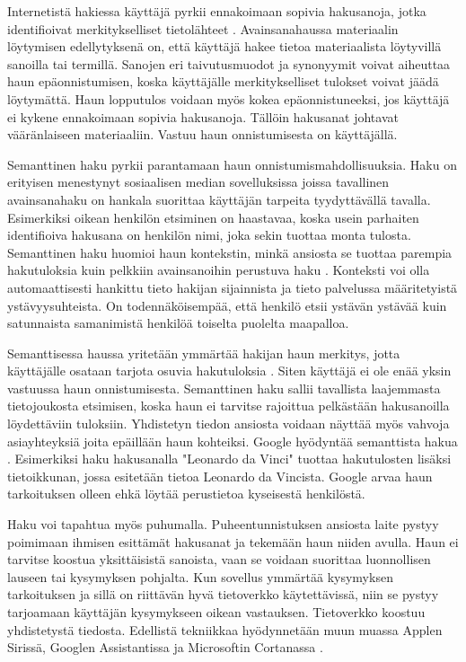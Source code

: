 \documentclass[finnish, 12pt, a4paper, elec, utf8, pdfa, online]{aaltothesis}
\begin{document}
{Internetistä hakiessa käyttäjä pyrkii ennakoimaan sopivia hakusanoja, jotka identifioivat merkitykselliset tietolähteet \cite{keyword_search}. Avainsanahaussa materiaalin löytymisen edellytyksenä on, että käyttäjä hakee tietoa materiaalista löytyvillä sanoilla tai termillä. Sanojen eri taivutusmuodot ja synonyymit voivat aiheuttaa haun epäonnistumisen, koska käyttäjälle merkitykselliset tulokset voivat jäädä löytymättä. Haun lopputulos voidaan myös kokea epäonnistuneeksi, jos käyttäjä ei kykene ennakoimaan sopivia hakusanoja. Tällöin hakusanat johtavat vääränlaiseen materiaaliin. Vastuu haun onnistumisesta on käyttäjällä.

Semanttinen haku pyrkii parantamaan haun onnistumismahdollisuuksia. Haku on erityisen menestynyt sosiaalisen median sovelluksissa joissa tavallinen avainsanahaku on hankala suorittaa käyttäjän tarpeita tyydyttävällä tavalla. Esimerkiksi oikean henkilön etsiminen on haastavaa, koska usein parhaiten identifioiva hakusana on henkilön nimi, joka sekin tuottaa monta tulosta. Semanttinen haku huomioi haun kontekstin, minkä ansiosta se tuottaa parempia hakutuloksia kuin pelkkiin avainsanoihin perustuva haku \cite{profium_search}. Konteksti voi olla automaattisesti hankittu tieto hakijan sijainnista ja tieto palvelussa määritetyistä ystävyysuhteista. On todennäköisempää, että henkilö etsii ystävän ystävää kuin satunnaista samanimistä henkilöä toiselta puolelta maapalloa.

Semanttisessa haussa yritetään ymmärtää hakijan haun merkitys, jotta käyttäjälle osataan tarjota osuvia hakutuloksia \cite{profium_search}. Siten käyttäjä ei ole enää yksin vastuussa haun onnistumisesta. Semanttinen haku sallii tavallista laajemmasta tietojoukosta etsimisen, koska haun ei tarvitse rajoittua pelkästään hakusanoilla löydettäviin tuloksiin. Yhdistetyn tiedon ansiosta voidaan näyttää myös vahvoja asiayhteyksiä joita epäillään haun kohteiksi. Google hyödyntää semanttista hakua \cite{knowledge_graph}  \cite{linked_data_finlad}. Esimerkiksi haku hakusanalla "Leonardo da Vinci" tuottaa hakutulosten lisäksi tietoikkunan, jossa esitetään tietoa Leonardo da Vincista. Google arvaa haun tarkoituksen olleen ehkä löytää perustietoa kyseisestä henkilöstä.

Haku voi tapahtua myös puhumalla. Puheentunnistuksen ansiosta laite pystyy poimimaan ihmisen esittämät hakusanat ja tekemään haun niiden avulla. Haun ei tarvitse koostua yksittäisistä sanoista, vaan se voidaan suorittaa luonnollisen lauseen tai kysymyksen pohjalta. Kun sovellus ymmärtää kysymyksen tarkoituksen ja sillä on riittävän hyvä tietoverkko käytettävissä, niin se pystyy tarjoamaan käyttäjän kysymykseen oikean vastauksen. Tietoverkko koostuu yhdistetystä tiedosta. Edellistä tekniikkaa hyödynnetään muun muassa Applen Sirissä, Googlen Assistantissa ja Microsoftin Cortanassa \cite{siri} \cite{assistant} \cite{cortana}.

}
\end{document}
